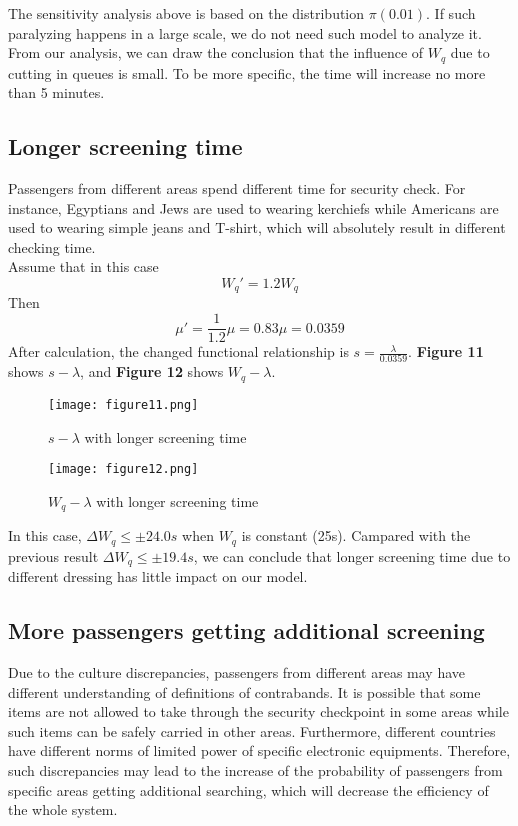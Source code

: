 \documentclass{mcmthesis}
\begin{document}
The sensitivity analysis above is based on the distribution $\pi(0.01)$. If such paralyzing happens in a large scale, we do not need such model to analyze it. From our analysis, we can draw the conclusion that the influence of $W_q$ due to cutting in queues is small. To be more specific, the time will increase no more than 5 minutes.

\subsection{Longer screening time}
Passengers from different areas spend different time for security check. For instance, Egyptians and Jews are used to wearing kerchiefs while Americans are used to wearing simple jeans and T-shirt, which will absolutely result in different checking time.\\
Assume that in this case 
$$W_q'=1.2W_q$$ 
Then 
$$\mu'=\frac{1}{1.2}\mu=0.83\mu=0.0359$$ 
After calculation, the changed functional relationship is $s=\frac{\lambda }{0.0359}$. \textbf{Figure 11} shows $s-\lambda$, and \textbf{Figure 12} shows $W_q-\lambda$.
\begin{figure}[H]
\small
\centering
\texttt{[image: figure11.png]}
\caption{$s-\lambda$ with longer screening time} \label{fig:11}
\end{figure}
\begin{figure}[h]
\small
\centering
\texttt{[image: figure12.png]}
\caption{$W_q-\lambda$ with longer screening time} \label{fig:12}
\end{figure}
 In this case, $\Delta W_q\leq \pm 24.0s$ when $W_q$ is constant (25s). Campared with the previous result $\Delta W_q\leq \pm 19.4s$, we can conclude that longer screening time due to different dressing has little impact on our model.

\subsection{More passengers getting additional screening}
Due to the culture discrepancies, passengers from different areas may have different understanding of definitions of contrabands. It is possible that some items are not allowed to take through the security checkpoint in some areas while such items can be safely carried in other areas. Furthermore, different countries have different norms of limited power of specific electronic equipments. Therefore, such discrepancies may lead to the increase of the probability of passengers from specific areas getting additional searching, which will decrease the efficiency of the whole system.
\end{document}
